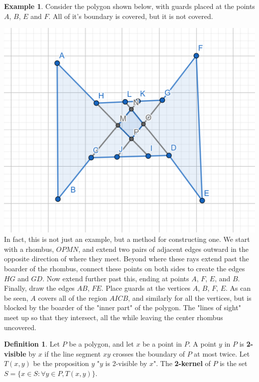 \documentclass[12pt]{article}
\theoremstyle{definition}
\newtheorem*{definition}{Definition}
\newtheorem{example}{Example}
\begin{document}
\begin{example}
Consider the polygon shown below, with guards placed at the points $A$, $B$, $E$ and $F$. All of it's boundary is covered, but it is not covered.
\end{example}
\includegraphics[scale=0.5]{boundary.png}\\

In fact, this is not just an example, but a method for constructing one. We start with a rhombus, $OPMN$, and extend two pairs of adjacent edges outward in the opposite direction of where they meet. Beyond where these rays extend past the boarder of the rhombus, connect these points on both sides to create the edges $HG$ and $GD$. Now extend further past this, ending at points $A$, $F$, $E$, and $B$. Finally, draw the edges $AB$, $FE$. Place guards at the vertices $A$, $B$, $F$, $E$. As can be seen, $A$ covers all of the region $AICB$, and similarly for all the vertices, but is blocked by the boarder of the "inner part" of the polygon. The "lines of sight" meet up so that they intersect, all the while leaving the center rhombus uncovered.


\begin{definition}
Let $P$ be a polygon, and let $x$ be a point in $P$. A point $y$ in $P$ is \textbf{2-visible} by $x$ if the line segment $xy$ crosses the boundary of $P$ at most twice. Let $T(x,y)$ be the proposition $y$ "$y$ is 2-visible by $x$". The \textbf{2-kernel} of $P$ is the set $ S = \{x\in S: \forall y\in P, T(x,y)\}$.
\end{definition}
\end{document}
